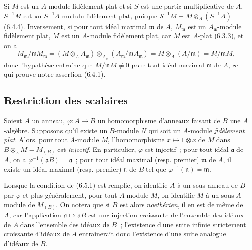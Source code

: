\begin{env}[6.4.5]
\label{0.6.4.5-fr}
Si $M$ est un $A$-module fidèlement plat et si $S$ est une partie
multiplicative de $A$, $S^{-1}M$ est un $S^{-1}A$-module fidèlement plat,
puisque $S^{-1}M=M\otimes_A(S^{-1}A)$ (6.4.4). Inversement, si pour tout
idéal maximal $\mathfrak{m}$ de $A$, $M_\mathfrak{m}$ est un
$A_\mathfrak{m}$-module fidèlement plat, $M$ est un $A$-module fidèlement
plat, car $M$ est $A$-plat (6.3.3), et on a
\[
  M_\mathfrak{m}/\mathfrak{m}M_\mathfrak{m}
  =(M\otimes_A A_\mathfrak{m})
  \otimes_{A_\mathfrak{m}}
  (A_\mathfrak{m}/\mathfrak{m}A_\mathfrak{m})
  =M\otimes_A(A/\mathfrak{m})
  =M/\mathfrak{m}M,
\]
donc l'hypothèse entraîne que $M/\mathfrak{m}M\neq0$ pour tout idéal
maximal $\mathfrak{m}$ de $A$, ce qui prouve notre assertion (6.4.1).
\end{env}

\subsection{Restriction des scalaires}
\label{subsection:0.6.5-fr}

\begin{env}[6.5.1]
\label{0.6.5.1-fr}
Soient $A$ un anneau, $\varphi:A\to B$ un homomorphisme d'anneaux faisant
de $B$ une $A$-algèbre. Supposons qu'il existe un $B$-module $N$ qui soit un
$A$-module \emph{fidèlement plat}. Alors, pour tout $A$-module $M$,
l'homomorphisme $x\mapsto 1\otimes x$ de $M$ dans
$B\otimes_A M=M_{(B)}$ est \emph{injectif}. En particulier, $\varphi$ est
injectif~; pour tout idéal $\mathfrak{a}$ de $A$, on a
$\varphi^{-1}(\mathfrak{a}B)=\mathfrak{a}$~; pour tout idéal maximal (resp.
premier) $\mathfrak{m}$ de $A$, il existe un idéal maximal (resp. premier)
$\mathfrak{n}$ de $B$ tel que $\varphi^{-1}(\mathfrak{n})=\mathfrak{m}$.
\end{env}

\begin{env}[6.5.2]
\label{0.6.5.2-fr}
Lorsque la condition de (6.5.1) est remplie, on identifie $A$ à un
sous-anneau de $B$ par $\varphi$ et plus généralement, pour tout $A$-module
$M$, on identifie $M$ à un sous-$A$-module de $M_{(B)}$. On notera que si
$B$ est alors \emph{noethérien}, il en est de même de $A$, car l'application
$\mathfrak{a}\mapsto\mathfrak{a}B$ est une injection croissante de
l'ensemble des idéaux de $A$ dans l'ensemble des idéaux de $B$~;
l'existence d'une suite infinie strictement croissante d'idéaux de $A$
entraînerait donc l'existence d'une suite analogue d'idéaux de $B$.
\end{env}

